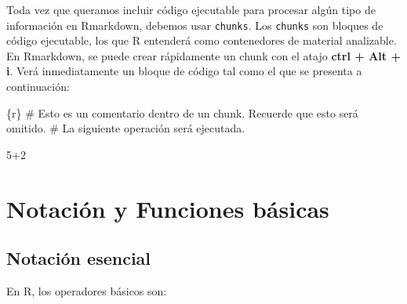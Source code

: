\documentclass[
]{book}
\newenvironment{Shaded}{\begin{snugshade}}{\end{snugshade}}
\newcommand{\AttributeTok}[1]{\textcolor[rgb]{0.13,0.29,0.53}{#1}}
\newcommand{\StringTok}[1]{\textcolor[rgb]{0.31,0.60,0.02}{#1}}
\begin{document}
Toda vez que queramos incluir código ejecutable para procesar algún tipo de información en Rmarkdown, debemos usar \texttt{chunks}. Los \texttt{chunks} son bloques de código ejecutable, los que R entenderá como contenedores de material analizable. En Rmarkdown, se puede crear rápidamente un chunk con el atajo \textbf{ctrl + Alt + i}. Verá inmediatamente un bloque de código tal como el que se presenta a continuación:

\begin{Shaded}
\begin{Highlighting}[]
\StringTok{\textasciigrave{}\textasciigrave{}\textasciigrave{}}\AttributeTok{\{r\}}
\AttributeTok{\# Esto es un comentario dentro de un chunk. Recuerde que esto será omitido.}
\AttributeTok{\# La siguiente operación será ejecutada.}

\AttributeTok{5+2 }

\StringTok{\textasciigrave{}\textasciigrave{}\textasciigrave{}}
\end{Highlighting}
\end{Shaded}

\chapter{Notación y Funciones básicas}\label{notacion-funciones}

\section{Notación esencial}\label{notaciuxf3n-esencial}

En R, los operadores básicos son:
\end{document}
